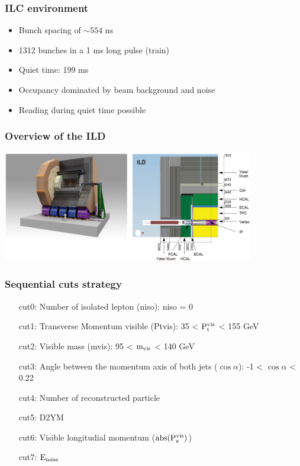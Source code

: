 \documentclass{beamer}
\begin{document}
  \begin{frame}
    \frametitle{ILC environment}

    \begin{itemize}
      \item Bunch spacing of $\sim 554$ ns
      \item 1312 bunches in a 1 ms long pulse (train)
      \item Quiet time: 199 ms
      \item Occupancy dominated by beam background and noise
      \item Reading during quiet time possible
    \end{itemize}

  \end{frame}


\begin{frame}[plain]
    \frametitle{Overview of the ILD}

    \begin{center}
        \includegraphics[width = 11cm]{Pictures/ild-detector-ilc.jpg}
    \end{center}
\end{frame}

\begin{frame}[plain,label=cuts]
  \frametitle{Sequential cuts strategy}
      \begin{enumerate}
          \item [cut0:] Number of isolated lepton (niso): niso = 0 %
          \item [cut1:] Transverse Momentum visible (Ptvis): 35 < $\rm{P_{t}^{vis}}$ < 155 GeV
          \item [cut2:] Visible mass (mvis): 95 < $\rm{m_{vis}}$ < 140 GeV
          \item [cut3:] Angle between the momentum axis of both jets ($\cos{\alpha}$): -1 < $\cos{\alpha}$ < 0.22
          \item [cut4:] Number of reconstructed particle 
          \item [cut5:] D2YM
          \item [cut6:] Visible longitudial momentum ($\rm{abs(P_{z}^{vis})}$)
          \item [cut7:] $\rm{E_{miss}}$
      \end{enumerate}
\end{frame}
\end{document}
